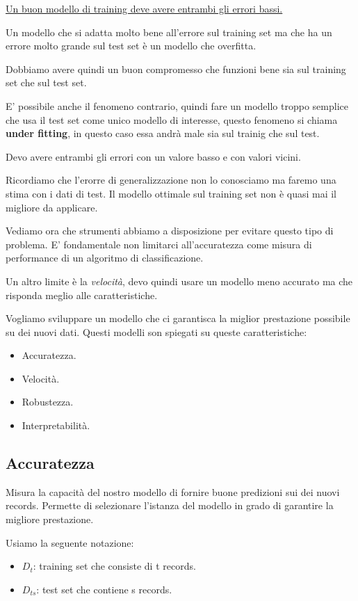\documentclass[12pt, a4paper,titlepage,openany]{article}
\begin{document}
\underline{Un buon modello di training deve avere entrambi gli errori bassi.}


Un modello che si adatta molto bene all'errore sul training set ma che ha un errore molto grande sul test set è un modello che overfitta.

Dobbiamo avere quindi un buon compromesso che funzioni bene sia sul training set che sul test set. 

E' possibile anche il fenomeno contrario, quindi fare un modello troppo semplice che usa il test set come unico modello di interesse, questo fenomeno si chiama \textbf{under fitting}, in questo caso essa andrà male sia sul trainig che sul test. 

 Devo avere entrambi gli errori con un valore basso e  con valori vicini.
 
 Ricordiamo che l'erorre di generalizzazione non lo conosciamo ma faremo una stima con i dati di test. 
 Il modello ottimale sul training set non è quasi mai il migliore da applicare.
 
 
Vediamo ora che strumenti abbiamo a disposizione per evitare questo tipo di problema. E' fondamentale non limitarci all'accuratezza come  misura di performance di un algoritmo di classificazione.

Un altro limite è la \textit{velocità}, devo quindi usare un modello meno accurato ma che risponda meglio alle caratteristiche.

Vogliamo sviluppare un modello che ci garantisca la miglior prestazione possibile su dei nuovi dati. Questi modelli son spiegati su queste caratteristiche:
\begin{itemize}
	\item Accuratezza.
	\item Velocità.
	\item Robustezza.
	\item Interpretabilità.
\end{itemize}

\subsection{Accuratezza}

Misura la capacità del nostro modello di fornire buone predizioni sui dei nuovi records. Permette di selezionare l'istanza del modello in grado di garantire la migliore prestazione.

Usiamo la seguente notazione:

\begin{itemize}
	\item $D_{t}$: training set che consiste di t records.
	\item $D_{ts}$: test set che contiene s records.
\end{itemize}
\end{document}
